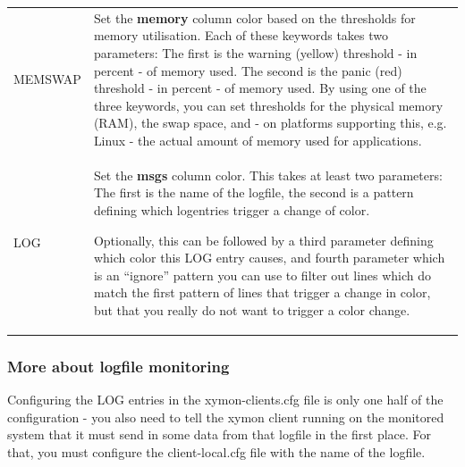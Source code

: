 \begin{tabular}{l|l}
MEMSWAP & Set the \textbf{memory}
 column color based on the thresholds for memory utilisation. Each of these keywords takes two parameters: The first is the warning (yellow) threshold - in percent - of memory used. The second is the panic (red) threshold - in percent - of memory used. 
 By using one of the three keywords, you can set thresholds for the physical memory (RAM), the swap space, and - on platforms supporting this, e.g. Linux - the actual amount of memory used for applications.  \\

LOG & Set the \textbf{msgs} column color. This takes at least two
 parameters: The first is the name of the logfile, the second is a
 pattern defining which logentries trigger a change of color. 

 Optionally, this can be followed by a third parameter defining which color this LOG entry causes, and fourth parameter which is an ``ignore'' pattern you can use to filter out lines which do match the first pattern of lines that trigger a change in color, but that you really do not want to trigger a color change. 


\end{tabular}

\subsubsection{More about logfile monitoring}


 Configuring the LOG entries in the xymon-clients.cfg file is only one half of the configuration - you also need to tell the xymon client running on the monitored system that it must send in some data from that logfile in the first place. For that, you must configure the  client-local.cfg file with the name of the logfile.

